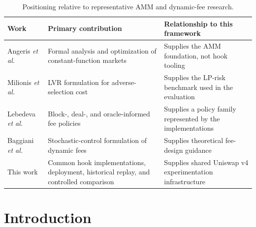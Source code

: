 \documentclass[a4paper,conference]{IEEEtran}
\begin{document}
\begin{table}[!t]
  \caption{Positioning relative to representative AMM and dynamic-fee research.}
  \label{tab:relatedwork}
  \centering
  \footnotesize
  \begin{tabular}{p{3.7cm}p{5.8cm}p{5.7cm}}
    \toprule
    \textbf{Work} &
    \textbf{Primary contribution} &
    \textbf{Relationship to this framework}\\
    \midrule
    Angeris \emph{et al.}~\cite{angeris2019analysis,angeris2022multiasset}
    & Formal analysis and optimization of constant-function markets
    & Supplies the AMM foundation, not hook tooling\\

    Milionis \emph{et al.}~\cite{milionis2022lvr}
    & LVR formulation for adverse-selection cost
    & Supplies the LP-risk benchmark used in the evaluation\\

    Lebedeva \emph{et al.}~\cite{lebedeva2025dynamic}
    & Block-, deal-, and oracle-informed fee policies
    & Supplies a policy family represented by the implementations\\

    Baggiani \emph{et al.}~\cite{baggiani2025optimal}
    & Stochastic-control formulation of dynamic fees
    & Supplies theoretical fee-design guidance\\

    This work
    & Common hook implementations, deployment, historical replay, and controlled comparison
    & Supplies shared Uniswap v4 experimentation infrastructure\\
    \bottomrule
  \end{tabular}
\end{table}

\section{Introduction}
\label{sec}
\end{document}
